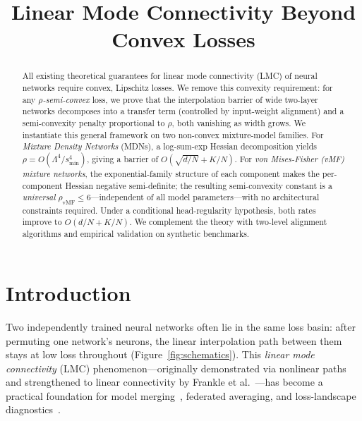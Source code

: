 \documentclass[11pt]{article}
\title{Linear Mode Connectivity Beyond Convex Losses}
\author{}
\date{}
\DeclareMathOperator{\vmf}{vMF}
\begin{document}
\maketitle

\begin{abstract}
All existing theoretical guarantees for linear mode connectivity (LMC)
of neural networks require convex, Lipschitz losses.
We remove this convexity requirement: for any
\emph{$\rho$-semi-convex} loss, we prove that the interpolation
barrier of wide two-layer networks decomposes into a transfer term
(controlled by input-weight alignment) and a semi-convexity penalty
proportional to $\rho$, both vanishing as width grows.
We instantiate this general framework on two non-convex mixture-model
families.
For \emph{Mixture Density Networks} (MDNs), a log-sum-exp Hessian
decomposition yields $\rho = O(\Lambda^4/s_{\min}^4)$, giving a
barrier of $O(\sqrt{d/N} + K/N)$.
For \emph{von Mises-Fisher (vMF) mixture networks}, the
exponential-family structure of each component makes the per-component
Hessian negative semi-definite; the resulting semi-convexity constant
is a \emph{universal} $\rho_{\vmf} \le 6$---independent of all model
parameters---with no architectural constraints required.
Under a conditional head-regularity hypothesis, both rates improve
to $O(d/N + K/N)$.
We complement the theory with two-level alignment algorithms and
empirical validation on synthetic benchmarks.
\end{abstract}

\section{Introduction}\label{sec:intro}

Two independently trained neural networks often lie in the same loss
basin: after permuting one network's neurons, the linear interpolation
path between them stays at low loss throughout
(Figure~\ref{fig:schematics}).
This \emph{linear mode connectivity} (LMC) phenomenon---originally
demonstrated via nonlinear paths~\cite{garipov2018,draxler2018} and
strengthened to linear connectivity by
Frankle et al.~\cite{frankle2020}---has become a practical foundation
for model merging~\cite{wortsman2022soups,ilharco2023task,yadav2023ties},
federated averaging, and loss-landscape
diagnostics~\cite{entezari2022,ainsworth2023}.
\end{document}
